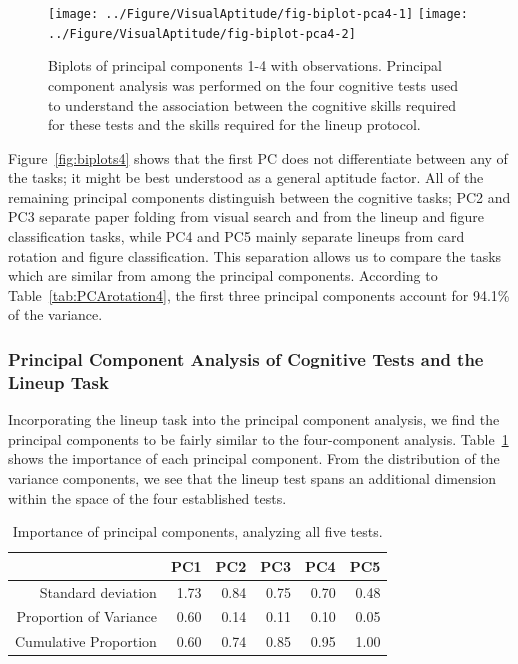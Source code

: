 \documentclass[11pt]{isuthesis}\usepackage[]{graphicx}\usepackage[]{color}
\newenvironment{knitrout}{}{} %
\begin{document}
\begin{knitrout}
\color{fgcolor}\begin{figure}

{\centering \texttt{[image: ../Figure/VisualAptitude/fig-biplot-pca4-1]} 
\texttt{[image: ../Figure/VisualAptitude/fig-biplot-pca4-2]} 

}

\caption{Biplots of principal components 1-4 with observations. Principal component analysis was performed on the four cognitive tests used to understand the association between the cognitive skills required for these tests and the skills required for the lineup protocol.  \label{fig:biplots4}}\label{fig:biplot-pca4}
\end{figure}


\end{knitrout}
Figure~\ref{fig:biplots4} shows that the first PC does not differentiate between any of the tasks; it might be best understood as a general aptitude factor. All of the remaining principal components distinguish between the cognitive tasks; 
PC2 and PC3 separate  paper folding from visual search and from the lineup and figure classification tasks, while PC4 and PC5 mainly separate lineups from card rotation and figure classification. This separation allows us to compare the tasks which are similar from among the principal components. 
According to Table~\ref{tab:PCArotation4}, the first three principal components account for 94.1\% of the variance.

\subsubsection{Principal Component Analysis of Cognitive Tests and the Lineup Task }
Incorporating the lineup task into the principal component analysis, we find the principal components to be fairly similar to the four-component analysis. 
Table~\ref{tab:PCAvariance5} shows the importance of each principal component. From the distribution of the variance components, we see that the lineup test  spans an additional dimension within the space of the four established tests. 
\begin{table}[ht]
\centering
\caption{Importance of principal components, analyzing all five tests.\label{tab:PCAvariance5}} 
{\footnotesize
\begin{tabular}{rrrrrr}
  \hline
 & PC1 & PC2 & PC3 & PC4 & PC5 \\ 
  \hline
Standard deviation & 1.73 & 0.84 & 0.75 & 0.70 & 0.48 \\ 
  Proportion of Variance & 0.60 & 0.14 & 0.11 & 0.10 & 0.05 \\ 
  Cumulative Proportion & 0.60 & 0.74 & 0.85 & 0.95 & 1.00 \\ 
   \hline
\end{tabular}
}
\end{table}
\end{document}
